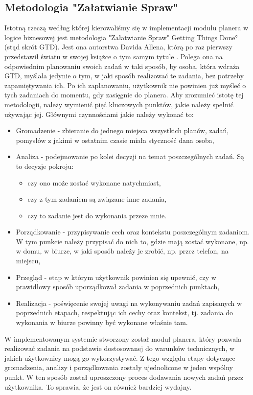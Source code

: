 \subsection{Metodologia "Załatwianie Spraw"}
\label{ssec:GTD}
Istotną rzeczą według której kierowaliśmy się w implementacji modułu planera w logice biznesowej jest metodologia "Załatwianie Spraw" \ang{Getting Things Done} (stąd skrót GTD). Jest ona autorstwa Davida Allena, którą po raz pierwszy przedstawił światu w swojej książce o tym samym tytule \cite{GTD}. Polega ona na odpowiednim planowaniu swoich zadań w taki sposób, by osoba, która wdraża GTD, myślała jedynie o tym, w jaki sposób realizować te zadania, bez potrzeby zapamiętywania ich. Po ich zaplanowaniu, użytkownik nie powinien już myśleć o tych zadaniach do momentu, gdy zasięgnie do planera. Aby zrozumieć istotę tej metodologii, należy wymienić pięć kluczowych punktów, jakie należy spełnić używając jej. Głównymi czynnościami jakie należy wykonać to:
\begin{itemize}
    \item Gromadzenie - zbieranie do jednego miejsca wszystkich planów, zadań, pomysłów z jakimi w ostatnim czasie miała styczność dana osoba,
    \item Analiza - podejmowanie po kolei decyzji na temat poszczególnych zadań. Są to decyzje pokroju:
    \begin{itemize}
        \item czy ono może zostać wykonane natychmiast,
        \item czy z tym zadaniem są związane inne zadania,
        \item czy to zadanie jest do wykonania przeze mnie. 
    \end{itemize}
    \item Porządkowanie - przypisywanie cech oraz kontekstu poszczególnym zadaniom. W tym punkcie należy przypisać do nich to, gdzie mają zostać wykonane, np. w domu, w biurze, w jaki sposób należy je zrobić, np. przez telefon, na miejscu,
    \item Przegląd - etap w którym użytkownik powinien się upewnić, czy w prawidłowy sposób uporządkował zadania w poprzednich punktach,
    \item Realizacja - poświęcenie swojej uwagi na wykonywaniu zadań zapisanych w poprzednich etapach, respektując ich cechy oraz kontekst, tj. zadania do wykonania w biurze powinny być wykonane właśnie tam.
\end{itemize}
W implementowanym systemie stworzony został moduł planera, który pozwala realizować zadania na podstawie dostosowanej do warunków technicznych, w jakich użytkownicy mogą go wykorzystywać. Z tego względu etapy dotyczące gromadzenia, analizy i porządkowania zostały ujednolicone w jeden wspólny punkt. W ten sposób został uproszczony proces dodawania nowych zadań przez użytkownika. To sprawia, że jest on również bardziej wydajny.

